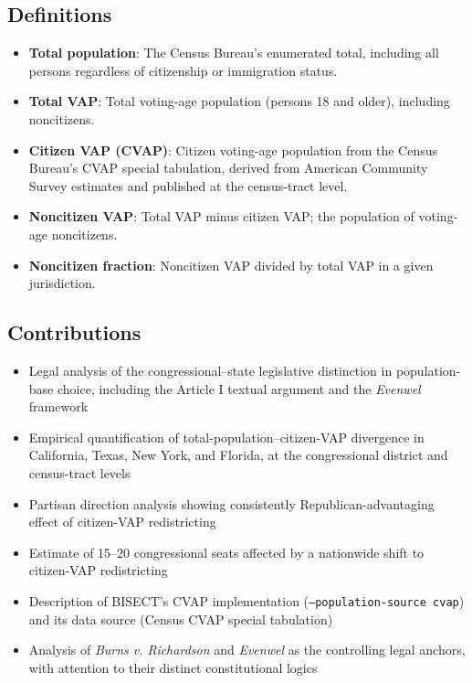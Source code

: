 \subsection{Definitions}

\begin{itemize}
    \item \textbf{Total population}: The Census Bureau's enumerated total, including all persons regardless of citizenship or immigration status.
    \item \textbf{Total VAP}: Total voting-age population (persons 18 and older), including noncitizens.
    \item \textbf{Citizen VAP (CVAP)}: Citizen voting-age population from the Census Bureau's CVAP special tabulation, derived from American Community Survey estimates and published at the census-tract level.
    \item \textbf{Noncitizen VAP}: Total VAP minus citizen VAP; the population of voting-age noncitizens.
    \item \textbf{Noncitizen fraction}: Noncitizen VAP divided by total VAP in a given jurisdiction.
\end{itemize}

\subsection{Contributions}

\begin{itemize}
    \item Legal analysis of the congressional--state legislative distinction in population-base choice, including the Article I textual argument and the \emph{Evenwel} framework
    \item Empirical quantification of total-population--citizen-VAP divergence in California, Texas, New York, and Florida, at the congressional district and census-tract levels
    \item Partisan direction analysis showing consistently Republican-advantaging effect of citizen-VAP redistricting
    \item Estimate of 15--20 congressional seats affected by a nationwide shift to citizen-VAP redistricting
    \item Description of BISECT's CVAP implementation (\texttt{--population-source cvap}) and its data source (Census CVAP special tabulation)
    \item Analysis of \emph{Burns v. Richardson} and \emph{Evenwel} as the controlling legal anchors, with attention to their distinct constitutional logics
\end{itemize}
